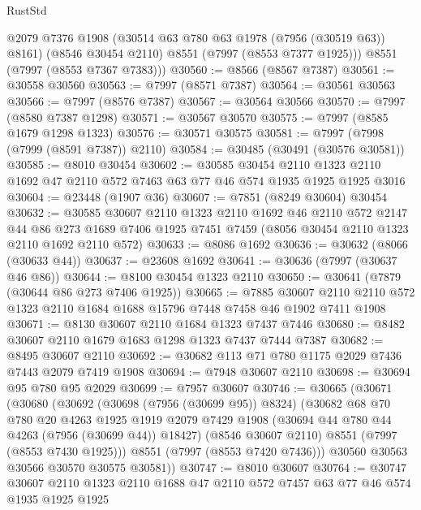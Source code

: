 \begin{lexlean}{RustStd}
\begin{coremodule}
        @2079
        @7376
        @1908
        (@30514 @63 @780 @63 @1978 (@7956 (@30519 @63)) @8161)
        (@8546 @30454 @2110)
        @8551
        (@7997 (@8553 @7377 @1925)))
      @8551
      (@7997 (@8553 @7367 @7383)))
@30560 := @8566 (@8567 @7387)
@30561 := @30558 @30560
@30563 := @7997 (@8571 @7387)
@30564 := @30561 @30563
@30566 := @7997 (@8576 @7387)
@30567 := @30564 @30566
@30570 := @7997 (@8580 @7387 @1298)
@30571 := @30567 @30570
@30575 := @7997 (@8585 @1679 @1298 @1323)
@30576 := @30571 @30575
@30581 := @7997 (@7998 (@7999 (@8591 @7387)) @2110)
@30584 := @30485 (@30491 (@30576 @30581))
@30585 := @8010 @30454
@30602 := @30585
    @30454
    @2110
    @1323
    @2110
    @1692
    @47
    @2110
    @572
    @7463
    @63
    @77
    @46
    @574
    @1935
    @1925
    @1925
    @3016
@30604 := @23448 (@1907 @36)
@30607 := @7851 (@8249 @30604) @30454
@30632 := @30585
    @30607
    @2110
    @1323
    @2110
    @1692
    @46
    @2110
    @572
    @2147
    @44
    @86
    @273
    @1689
    @7406
    @1925
    @7451
    @7459
    (@8056 @30454 @2110 @1323 @2110 @1692 @2110 @572)
@30633 := @8086 @1692
@30636 := @30632 (@8066 (@30633 @44))
@30637 := @23608 @1692
@30641 := @30636 (@7997 (@30637 @46 @86))
@30644 := @8100 @30454 @1323 @2110
@30650 := @30641 (@7879 (@30644 @86 @273 @7406 @1925))
@30665 := @7885
    @30607
    @2110
    @2110
    @572
    @1323
    @2110
    @1684
    @1688
    @15796
    @7448
    @7458
    @46
    @1902
    @7411
    @1908
@30671 := @8130 @30607 @2110 @1684 @1323 @7437 @7446
@30680 := @8482 @30607 @2110 @1679 @1683 @1298 @1323 @7437 @7444 @7387
@30682 := @8495 @30607 @2110
@30692 := @30682 @113 @71 @780 @1175 @2029 @7436 @7443 @2079 @7419 @1908
@30694 := @7948 @30607 @2110
@30698 := @30694 @95 @780 @95 @2029
@30699 := @7957 @30607
@30746 := @30665
    (@30671
      (@30680
        (@30692
          (@30698 (@7956 (@30699 @95)) @8324)
          (@30682
            @68
            @70
            @780
            @20
            @4263
            @1925
            @1919
            @2079
            @7429
            @1908
            (@30694 @44 @780 @44 @4263 (@7956 (@30699 @44)) @18427)
            (@8546 @30607 @2110)
            @8551
            (@7997 (@8553 @7430 @1925)))
          @8551
          (@7997 (@8553 @7420 @7436)))
        @30560
        @30563
        @30566
        @30570
        @30575
        @30581))
@30747 := @8010 @30607
@30764 := @30747
    @30607
    @2110
    @1323
    @2110
    @1688
    @47
    @2110
    @572
    @7457
    @63
    @77
    @46
    @574
    @1935
    @1925
    @1925

\end{coremodule}
\end{lexlean}
